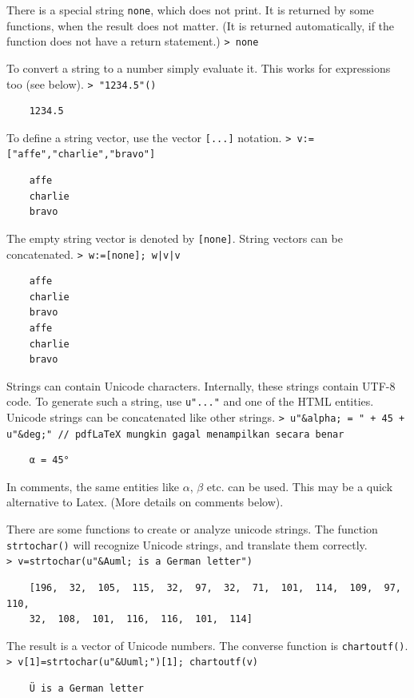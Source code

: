 \documentclass[11pt, a4paper]{article}
\newcommand{\emtcmd}[1]{\noindent\texttt{\textcolor{emtcommand}{>}\ #1}\par\smallskip}
\begin{document}
There is a special string \texttt{none}, which does not print. It is returned by some functions, when the result does not matter. (It is returned automatically, if the function does not have a return statement.)
\emtcmd{none}

To convert a string to a number simply evaluate it. This works for expressions too (see below).
\emtcmd{"1234.5"()}
\begin{verbatim}
    1234.5
\end{verbatim}

To define a string vector, use the vector \texttt{[...]} notation.
\emtcmd{v:=["affe","charlie","bravo"]}
\begin{verbatim}
    affe
    charlie
    bravo
\end{verbatim}

The empty string vector is denoted by \texttt{[none]}. String vectors can be concatenated.
\emtcmd{w:=[none]; w|v|v}
\begin{verbatim}
    affe
    charlie
    bravo
    affe
    charlie
    bravo
\end{verbatim}

Strings can contain Unicode characters. Internally, these strings contain UTF-8 code. To generate such a string, use \texttt{u"..."} and one of the HTML entities. Unicode strings can be concatenated like other strings.
\emtcmd{u"\&alpha; = " + 45 + u"\&deg;" \textcolor{emtcomment}{// pdfLaTeX mungkin gagal menampilkan secara benar}}
\begin{verbatim}
    α = 45°
\end{verbatim}

In comments, the same entities like $\alpha$, $\beta$ etc. can be used. This may be a quick alternative to Latex. (More details on comments below).

There are some functions to create or analyze unicode strings. The function \texttt{strtochar()} will recognize Unicode strings, and translate them correctly.
\emtcmd{v=strtochar(u"\&Auml; is a German letter")}
\begin{verbatim}
    [196,  32,  105,  115,  32,  97,  32,  71,  101,  114,  109,  97,  110,
    32,  108,  101,  116,  116,  101,  114]
\end{verbatim}

The result is a vector of Unicode numbers. The converse function is \texttt{chartoutf()}.
\emtcmd{v[1]=strtochar(u"\&Uuml;")[1]; chartoutf(v)}
\begin{verbatim}
    Ü is a German letter
\end{verbatim}
\end{document}
